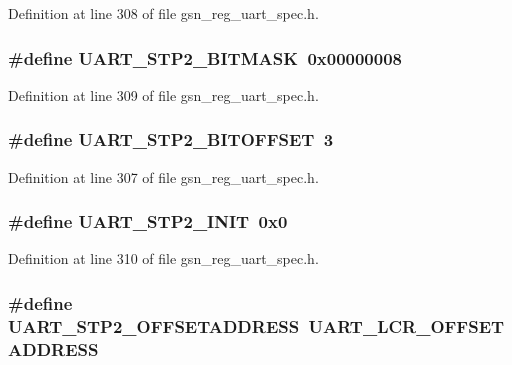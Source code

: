 Definition at line 308 of file gsn\_\-reg\_\-uart\_\-spec.h.

\hypertarget{a00575_a1744100a2771c5a1375d58271d563436}{
\subsubsection[{UART\_\-STP2\_\-BITMASK}]{\setlength{\rightskip}{0pt plus 5cm}\#define UART\_\-STP2\_\-BITMASK~0x00000008}}
\label{a00575_a1744100a2771c5a1375d58271d563436}


Definition at line 309 of file gsn\_\-reg\_\-uart\_\-spec.h.

\hypertarget{a00575_a5b701bc961d26890f60716eef3941c2f}{
\subsubsection[{UART\_\-STP2\_\-BITOFFSET}]{\setlength{\rightskip}{0pt plus 5cm}\#define UART\_\-STP2\_\-BITOFFSET~3}}
\label{a00575_a5b701bc961d26890f60716eef3941c2f}


Definition at line 307 of file gsn\_\-reg\_\-uart\_\-spec.h.

\hypertarget{a00575_a1aabaa11cd58fd0267a17241387e5d6e}{
\subsubsection[{UART\_\-STP2\_\-INIT}]{\setlength{\rightskip}{0pt plus 5cm}\#define UART\_\-STP2\_\-INIT~0x0}}
\label{a00575_a1aabaa11cd58fd0267a17241387e5d6e}


Definition at line 310 of file gsn\_\-reg\_\-uart\_\-spec.h.

\hypertarget{a00575_a47ee26ec19c2ef9f634a215ad46175f2}{
\subsubsection[{UART\_\-STP2\_\-OFFSETADDRESS}]{\setlength{\rightskip}{0pt plus 5cm}\#define UART\_\-STP2\_\-OFFSETADDRESS~UART\_\-LCR\_\-OFFSETADDRESS}}
\label{a00575_a47ee26ec19c2ef9f634a215ad46175f2}


